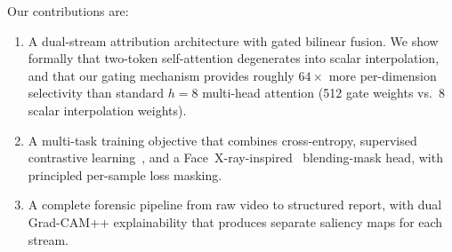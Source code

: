 \smallskip
\noindent Our contributions are:
\begin{enumerate}
    \item A dual-stream attribution architecture with gated bilinear fusion. We show formally that two-token self-attention degenerates into scalar interpolation, and that our gating mechanism provides roughly $64\times$ more per-dimension selectivity than standard $h{=}8$ multi-head attention (512 gate weights vs.\ 8 scalar interpolation weights).
    \item A multi-task training objective that combines cross-entropy, supervised contrastive learning~\cite{khosla2020supervised}, and a Face~X-ray-inspired~\cite{li2020facexray} blending-mask head, with principled per-sample loss masking.
    \item A complete forensic pipeline from raw video to structured report, with dual Grad-CAM++ explainability that produces separate saliency maps for each stream.
\end{enumerate}
